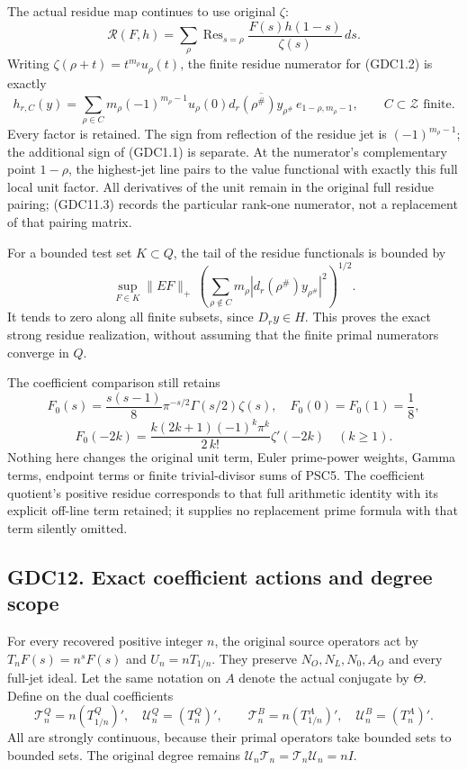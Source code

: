 The actual residue map continues to use original \(\zeta\): \[
\mathcal R(F,h)=\sum_\rho\operatorname{Res}_{s=\rho}
\frac{F(s)h(1-s)}{\zeta(s)}\,ds.
\tag{GDC11.2}
\] Writing \(\zeta(\rho+t)=t^{m_\rho}u_\rho(t)\), the finite residue
numerator for (GDC1.2) is exactly \[
h_{r,C}(y)=\sum_{\rho\in C}
m_\rho(-1)^{m_\rho-1}u_\rho(0)
\overline{d_r(\rho^\#)y_{\rho^\#}}\,
e_{1-\rho,m_\rho-1},\qquad C\subset\mathscr Z\text{ finite}.
\tag{GDC11.3}
\] Every factor is retained. The sign from reflection of the residue jet
is \((-1)^{m_\rho-1}\); the additional sign of (GDC1.1) is separate. At
the numerator's complementary point \(1-\rho\), the highest-jet line
pairs to the value functional with exactly this full local unit factor.
All derivatives of the unit remain in the original full residue pairing;
(GDC11.3) records the particular rank-one numerator, not a replacement
of that pairing matrix.

For a bounded test set \(K\subset Q\), the tail of the residue
functionals is bounded by \[
\sup_{F\in K}\|EF\|_+\,
\left(\sum_{\rho\notin C}m_\rho
|d_r(\rho^\#)y_{\rho^\#}|^2\right)^{1/2}.
\tag{GDC11.4}
\] It tends to zero along all finite subsets, since \(D_ry\in H\). This
proves the exact strong residue realization, without assuming that the
finite primal numerators converge in \(Q\).

The coefficient comparison still retains \[
F_0(s)=\frac{s(s-1)}8\pi^{-s/2}\Gamma(s/2)\zeta(s),
\quad F_0(0)=F_0(1)=\frac18,
\] \[
F_0(-2k)=\frac{k(2k+1)(-1)^k\pi^k}{2\,k!}\zeta'(-2k)
\quad(k\ge1).
\tag{GDC11.5}
\] Nothing here changes the original unit term, Euler prime-power
weights, Gamma terms, endpoint terms or finite trivial-divisor sums of
PSC5. The coefficient quotient's positive residue corresponds to that
full arithmetic identity with its explicit off-line term retained; it
supplies no replacement prime formula with that term silently omitted.

\subsection{GDC12. Exact coefficient actions and degree
scope}\label{gdc12.-exact-coefficient-actions-and-degree-scope}

For every recovered positive integer \(n\), the original source
operators act by \(T_nF(s)=n^sF(s)\) and \(U_n=nT_{1/n}\). They preserve
\(N_O,N_L,N_0,A_O\) and every full-jet ideal. Let the same notation on
\(A\) denote the actual conjugate by \(\Theta\). Define on the dual
coefficients \[
\mathcal T_n^Q=n(T_{1/n}^Q)',\quad
\mathcal U_n^Q=(T_n^Q)',\qquad
\mathcal T_n^B=n(T_{1/n}^A)',\quad
\mathcal U_n^B=(T_n^A)'.
\tag{GDC12.1}
\] All are strongly continuous, because their primal operators take
bounded sets to bounded sets. The original degree remains
\(\mathcal U_n\mathcal T_n=\mathcal T_n\mathcal U_n=nI\).

